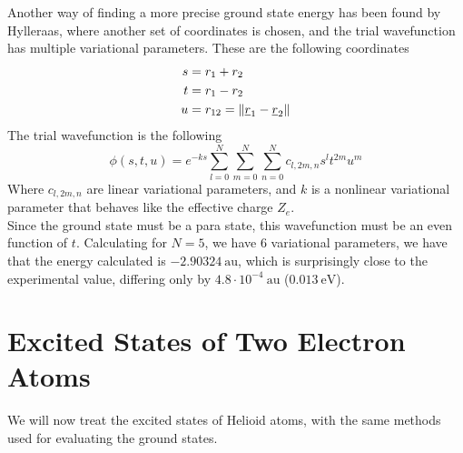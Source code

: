 \documentclass[../qm.tex]{subfiles}
\begin{document}
	Another way of finding a more precise ground state energy has been found by Hylleraas, where another set of coordinates is chosen, and the trial wavefunction has multiple variational parameters. These are the following coordinates
	\begin{equation*}
		\begin{aligned}
			s&=r_1+r_2\\
			t&=r_1-r_2\\
			u&=r_{12}=\norm{\underline{r}_1-\underline{r}_2}
		\end{aligned}
	\end{equation*}
	The trial wavefunction is the following
	\begin{equation*}
		\phi(s,t,u)=e^{-ks}\sum_{l=0}^N\sum_{m=0}^N\sum_{n=0}^Nc_{l,2m,n}s^lt^{2m}u^m
	\end{equation*}
	Where $c_{l,2m,n}$ are linear variational parameters, and $k$ is a nonlinear variational parameter that behaves like the effective charge $Z_e$.\\
	Since the ground state must be a para state, this wavefunction must be an even function of $t$. Calculating for $N=5$, we have $6$ variational parameters, we have that the energy calculated is $-2.90324\ \mathrm{au}$, which is surprisingly close to the experimental value, differing only by $4.8\cdot10^{-4}\ \mathrm{au}$ ($0.013\ \mathrm{eV}$).
	\section{Excited States of Two Electron Atoms}
	We will now treat the excited states of Helioid atoms, with the same methods used for evaluating the ground states.
\end{document}
